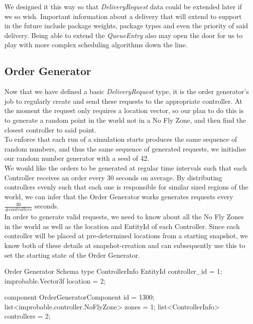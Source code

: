 \documentclass[a4paper,11pt,titlepage]{report}
\begin{document}
We designed it this way so that \textit{DeliveryRequest} data could be extended later if we so wish. Important information about a delivery that will extend to support in the future include package weights, package types and even the priority of said delivery. Being able to extend the \textit{QueueEntry} also may open the door for us to play with more complex scheduling algorithms down the line.

\subsection{Order Generator}
Now that we have defined a basic \textit{DeliveryRequest} type, it is the order generator's job to regularly create and send these requests to the appropriate controller. At the moment the request only requires a location vector, so our plan to do this is to generate a random point in the world not in a No Fly Zone, and then find the closest controller to said point.\\

To enforce that each run of a simulation starts produces the same sequence of random numbers, and thus the same sequence of generated requests, we initialise our random number generator with a seed of 42.\\

We would like the orders to be generated at regular time intervals such that each Controller receives an order every 30 seconds on average. By distributing controllers evenly such that each one is responsible for similar sized regions of the world, we can infer that the Order Generator works generates requests every $\frac{30}{\#controllers}$ seconds.\\

In order to generate valid requests, we need to know about all the No Fly Zones in the world as well as the location and EntityId of each Controller. Since each controller will be placed at pre-determined locations from a starting snapshot, we know both of these details at snapshot-creation and can subsequently use this to set the starting state of the Order Generator.

\clearpage
\begin{sexylisting}[colback=white]{Order Generator Schema}
type ControllerInfo {
  EntityId controller_id = 1;
  improbable.Vector3f location = 2;
}

component OrderGeneratorComponent {
  id = 1300;
  list<improbable.controller.NoFlyZone> zones = 1;
  list<ControllerInfo> controllers = 2;
}
\end{sexylisting}
\end{document}
